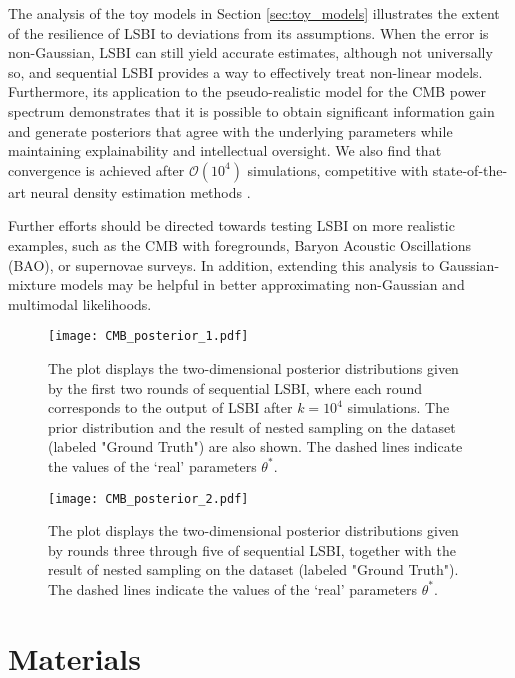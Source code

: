 \documentclass[%
 reprint,
 amsmath,amssymb,
 aps,
]{revtex4-2}
\begin{document}
The analysis of the toy models in Section \ref{sec:toy_models} illustrates the extent of the resilience of LSBI to deviations from its assumptions. When the error is non-Gaussian, LSBI can still yield accurate estimates, although not universally so, and sequential LSBI provides a way to effectively treat non-linear models.  Furthermore, its application to the pseudo-realistic model for the CMB power spectrum demonstrates that it is possible to obtain significant information gain and generate posteriors that agree with the underlying parameters while maintaining explainability and intellectual oversight.   We also find that convergence is achieved after $\mathcal{O}(10^4)$ simulations, competitive with state-of-the-art neural density estimation methods \cite{papamakarios2016fast,alsing2019fast,cole2022fast}. 

Further efforts should be directed towards testing LSBI on more realistic examples, such as the CMB with foregrounds, Baryon Acoustic Oscillations (BAO), or supernovae surveys.
In addition, extending this analysis to Gaussian-mixture models may be helpful in better approximating non-Gaussian and multimodal likelihoods. 


\begin{figure*}[p!]
\texttt{[image: CMB\_posterior\_1.pdf]}
\caption{\label{fig:CMB_posterior_1}
The plot displays the two-dimensional posterior distributions given by the first two rounds of sequential LSBI, where each round corresponds to the output of LSBI after $k= 10^4$ simulations. The prior distribution and the result of nested sampling on the dataset (labeled "Ground Truth") are also shown. The dashed lines indicate the values of the `real' parameters $\theta^\ast$.}
\end{figure*}

\begin{figure*}
\texttt{[image: CMB\_posterior\_2.pdf]}
\caption{\label{fig:CMB_posterior_2}
The plot displays the two-dimensional posterior distributions given by rounds three through five of sequential LSBI, together with the result of nested sampling on the dataset (labeled "Ground Truth"). The dashed lines indicate the values of the `real' parameters $\theta^\ast$.
}
\end{figure*}

\section{Materials}
\end{document}
